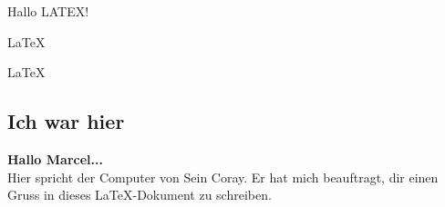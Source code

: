\documentclass{article}
\begin{document}
Hallo LATEX!  

\LaTeX 

\huge
\LaTeX\\

\begin{center}

\section{Ich war hier}
\textbf{Hallo Marcel...}\\
Hier spricht der Computer von Sein Coray. Er hat mich beauftragt, dir einen Gruss in dieses LaTeX-Dokument zu schreiben.
\end{center} 
   
\end{document}
